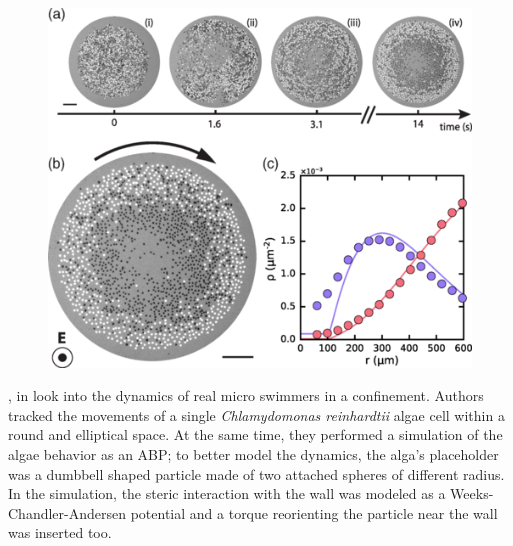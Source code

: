 \documentclass[../../master_thesis_np.tex]{subfiles}
\begin{document}
	\begin{figure}[htp]
		\centering
		\includegraphics[width=\singfigwidth]{maity1.png}
		\caption{\parencite{maity_spontaneous_2023}}
		\label{fig:maity1}
	\end{figure}
	
	\citeauthor{ostapenko_curvature-guided_2018}, in \cite{ostapenko_curvature-guided_2018} look into the dynamics of real micro swimmers in a confinement. Authors tracked the movements of a single \emph{Chlamydomonas reinhardtii} algae cell within a round and elliptical space. At the same time, they performed a simulation of the algae behavior as an ABP; to better model the dynamics, the alga's placeholder was a dumbbell shaped particle made of two attached spheres of different radius. In the simulation, the steric interaction with the wall was modeled as a Weeks-Chandler-Andersen potential and a torque reorienting the particle near the wall was inserted too.
	
\end{document}
